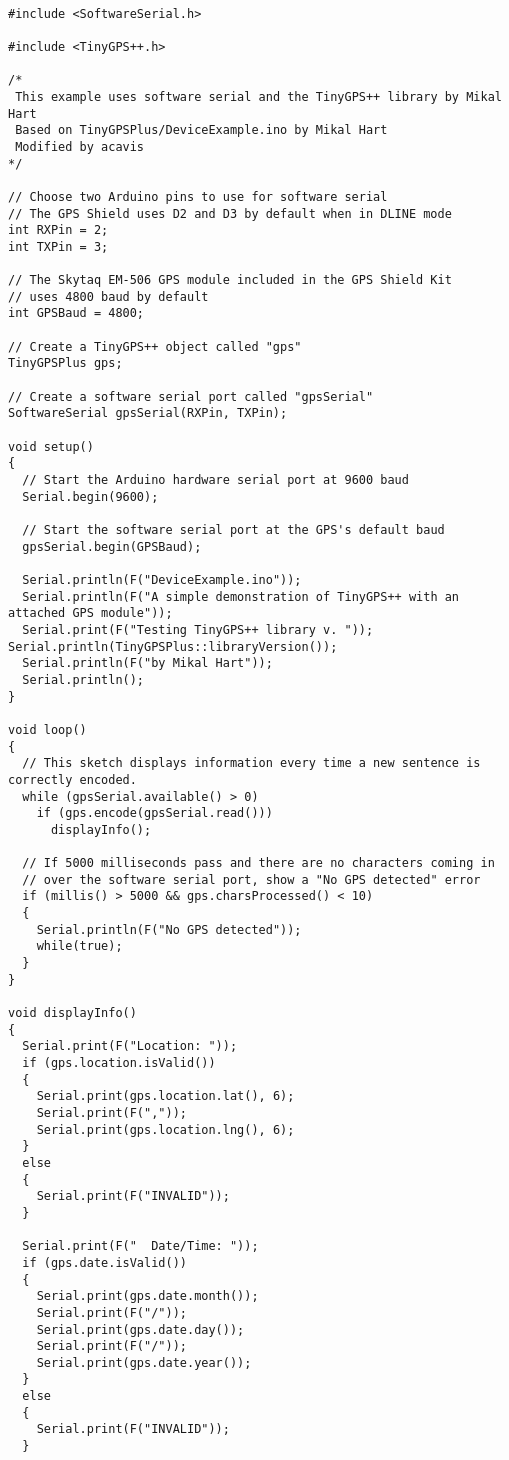 \begin{verbatim}

#include <SoftwareSerial.h>

#include <TinyGPS++.h>

/*
 This example uses software serial and the TinyGPS++ library by Mikal Hart
 Based on TinyGPSPlus/DeviceExample.ino by Mikal Hart
 Modified by acavis
*/

// Choose two Arduino pins to use for software serial
// The GPS Shield uses D2 and D3 by default when in DLINE mode
int RXPin = 2;
int TXPin = 3;

// The Skytaq EM-506 GPS module included in the GPS Shield Kit
// uses 4800 baud by default
int GPSBaud = 4800;

// Create a TinyGPS++ object called "gps"
TinyGPSPlus gps;

// Create a software serial port called "gpsSerial"
SoftwareSerial gpsSerial(RXPin, TXPin);

void setup()
{
  // Start the Arduino hardware serial port at 9600 baud
  Serial.begin(9600);

  // Start the software serial port at the GPS's default baud
  gpsSerial.begin(GPSBaud);

  Serial.println(F("DeviceExample.ino"));
  Serial.println(F("A simple demonstration of TinyGPS++ with an attached GPS module"));
  Serial.print(F("Testing TinyGPS++ library v. ")); Serial.println(TinyGPSPlus::libraryVersion());
  Serial.println(F("by Mikal Hart"));
  Serial.println();
}

void loop()
{
  // This sketch displays information every time a new sentence is correctly encoded.
  while (gpsSerial.available() > 0)
    if (gps.encode(gpsSerial.read()))
      displayInfo();

  // If 5000 milliseconds pass and there are no characters coming in
  // over the software serial port, show a "No GPS detected" error
  if (millis() > 5000 && gps.charsProcessed() < 10)
  {
    Serial.println(F("No GPS detected"));
    while(true);
  }
}
 
void displayInfo()
{
  Serial.print(F("Location: ")); 
  if (gps.location.isValid())
  {
    Serial.print(gps.location.lat(), 6);
    Serial.print(F(","));
    Serial.print(gps.location.lng(), 6);
  }
  else
  {
    Serial.print(F("INVALID"));
  }

  Serial.print(F("  Date/Time: "));
  if (gps.date.isValid())
  {
    Serial.print(gps.date.month());
    Serial.print(F("/"));
    Serial.print(gps.date.day());
    Serial.print(F("/"));
    Serial.print(gps.date.year());
  }
  else
  {
    Serial.print(F("INVALID"));
  }


\end{verbatim}
